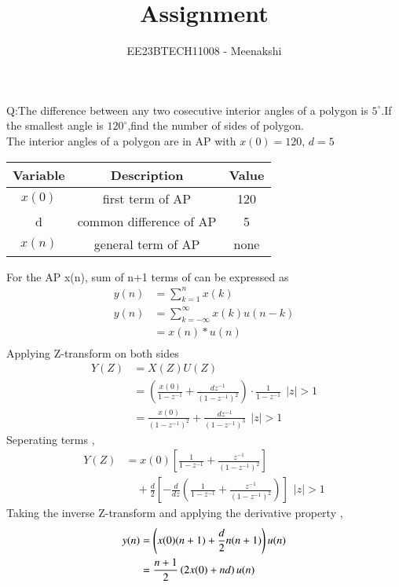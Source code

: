\documentclass[journal,12pt,twocolumn]{IEEEtran}
\theoremstyle{remark}
\begin{document}
\let\vec\mathbf



\vspace{3cm}
\title{Assignment}
\author{EE23BTECH11008 - Meenakshi}
\maketitle
\newpage
\bigskip

\renewcommand{\thefigure}{\theenumi}
\renewcommand{\thetable}{\theenumi}
Q:The difference between any two cosecutive interior angles of a polygon is $5^\circ$.If the smallest angle is $120^\circ$,find the number of sides of polygon.
\\\solution
The interior angles of a polygon are in AP with
    $x(0)=120$, $d=5$
\begin{table}[ht]
  \centering
  \begin{tabular}{|c|c|c|}
    \hline
      \textbf{Variable}& \textbf{Description}& \textbf{Value}\\\hline
    $x(0)$& first term of AP& 120  \\\hline
    d& common difference of AP & 5\\\hline
    $x(n)$ & general  term of AP&none\\\hline
  \end{tabular}
  \end {table}
For the AP x(n), sum of n+1 terms of can be expressed as
\begin{align}
    y(n)&=\sum_{k=1}^n x(k)\\
    y(n)&=\sum_{k=-\infty}^\infty x(k)u(n-k)\\
    &=x(n)*u(n)\\
\end{align}
Applying Z-transform on both sides \\
\begin{align}
    Y(Z) &= X(Z)U(Z) \\
    &= \left(\frac{x(0)}{1-z^{-1}} + \frac{dz^{-1}}{(1-z^{-1})^2}\right)\cdot \frac{1}{1-z^{-1}}\hspace{5pt} |z|>1\\
    &=\frac{x(0)}{(1-z^{-1})^2} + \frac{dz^{-1}}{(1-z^{-1})^3}\hspace{5pt} |z|>1
\end{align}
Seperating terms ,
\begin{align}
     Y(Z)& = x(0) \left[\frac{1}{1-z^{-1}} + \frac{z^{-1}}{(1-z^{-1})^2}\right] \nonumber \\
    &\quad +\frac{d}{2}\left[-\frac{d}{dz}\left(\frac{1}{1-z^{-1}} + \frac{z^{-1}}{(1-z^{-1})^2}\right)\right] \hspace{5pt} |z|>1
\end{align}
Taking the inverse Z-transform and applying the derivative property ,
\begin{align}
    y(n)&=\left(x(0)(n+1)+\frac{d}{2}n(n+1)\right)u(n)\\
    &=\frac{n+1}{2}\left(2x(0)+nd\right)u(n)
\end{align}
\end{document}
